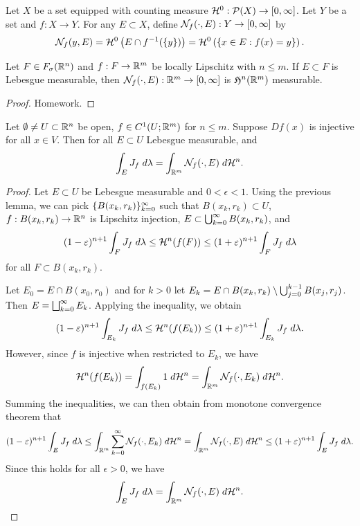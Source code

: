\documentclass[a4paper]{article}
\begin{document}
\begin{defi}
Let $X$ be a set equipped with counting measure 
$\mathcal{H}^0 : \mathcal{P}(X) \to [0, \infty]$. Let $Y$ be a set 
and $f: X \to Y$. For any $E \subset X$, define
$\mathcal{N}_f (\cdot, E) : Y \to [0, \infty]$ by 
\[
\mathcal{N}_f(y, E) = \mathcal{H}^0 \left( E \cap f^{-1} (\{y\}) \right) 
= \mathcal{H}^0 \left( \left\{ x \in E: f(x) = y \right\} \right).
\]
\end{defi}

\begin{thm}
Let $F \in F_\sigma(\mathbb{R}^n)$ and $f: F \to \mathbb{R}^m$ be locally 
Lipschitz with $n \leq m$. If $E \subset F$ is Lebesgue 
measurable, then $\mathcal{N}_f(\cdot, E) : \mathbb{R}^m \to [0, \infty]$
is $\mathfrak{H}^n(\mathbb{R}^m)$ measurable.
\end{thm}

\begin{proof}
Homework.
\end{proof}

\begin{lemma}
Let $\emptyset \neq U \subset \mathbb{R}^n$ be open, $f \in C^1 
(U ; \mathbb{R}^m)$ for $n \leq m$. Suppose $Df(x)$ is injective
for all $x \in V$. Then for all $E \subset U$ Lebesgue 
measurable, and 
\[
\int_E J_f \; d \lambda = \int_{\mathbb{R}^m} \mathcal{N}_f (\cdot, E) \; d \mathcal{H}^n.
\]
\end{lemma}

\begin{proof}
Let $E \subset U$ be Lebesgue measurable and $0 < \epsilon < 1$.
Using the previous lemma, we can pick $\{ B(x_k, r_k) \}_{k=0}^\infty$
such that $B(x_k, r_k) \subset U$, $f : B(x_k, r_k) \to \mathbb{R}^n$
is Lipschitz injection, $E \subset \bigcup_{k=0}^\infty B(x_k, r_k)$, and 
\[
(1 - \varepsilon)^{n+1} \int_F J_f \; d \lambda
\leq \mathcal{H}^n (f(F))
\leq (1 + \varepsilon)^{n+1} \int_F J_f \; d \lambda
\]
for all $F \subset B(x_k, r_k)$.

Let $E_0 = E \cap B(x_0, r_0)$ and for $k > 0$ let 
$E_k = E \cap B(x_k, r_k) \setminus \bigcup_{j=0}^{k-1} B(x_j, r_j)$.
Then $E = \bigsqcup_{k=0}^\infty E_k$. Applying the inequality, we obtain 
\[
(1 - \varepsilon)^{n+1} \int_{E_k} J_f \; d \lambda 
\leq \mathcal{H}^n (f(E_k)) 
\leq (1 + \varepsilon)^{n+1} \int_{E_k} J_f \; d \lambda.
\]
However, since $f$ is injective when restricted to $E_k$,
we have 
\[
\mathcal{H}^n (f(E_k)) 
= \int_{f(E_k)} 1 \; d \mathcal{H}^n
= \int_{\mathbb{R}^m} \mathcal{N}_f(\cdot, E_k) \; d \mathcal{H}^n.
\]
Summing the inequalities, we can then obtain from monotone
convergence theorem that 
\[
(1 - \varepsilon)^{n+1} \int_E J_f \; d \lambda
\leq \int_{\mathbb{R}^m} \sum_{k=0}^\infty \mathcal{N}_f(\cdot, E_k) \; d \mathcal{H}^n 
= \int_{\mathbb{R}^m} \mathcal{N}_f(\cdot, E) \; d \mathcal{H}^n
\leq (1 + \varepsilon)^{n+1} \int_E J_f \; d \lambda.
\]
Since this holds for all $\epsilon > 0$, we have 
\[
\int_E J_f \; d \lambda = \int_{\mathbb{R}^m} \mathcal{N}_f(\cdot, E) \; d \mathcal{H}^n.
\]
\end{proof}
\end{document}
